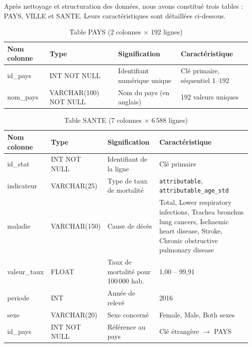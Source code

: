 \documentclass[mstat,12pt]{unswthesis}
\begin{document}
Après nettoyage et structuration des données, nous avons constitué trois
tables : PAYS, VILLE et SANTE. Leurs caractéristiques sont détaillées
ci-dessous.

\medskip

\begin{table}[H]
\centering
\renewcommand{\arraystretch}{1.3}
\begin{tabular}{|p{3cm}|p{3.5cm}|p{3cm}|p{3cm}|}
\hline
\textbf{Nom colonne} & \textbf{Type} & \textbf{Signification} & \textbf{Caractéristique} \\ \hline
id\_pays & INT NOT NULL & Identifiant numérique unique & Clé primaire, séquentiel 1--192 \\ \hline
nom\_pays & VARCHAR(100) NOT NULL & Nom du pays (en anglais) & 192 valeurs uniques \\ \hline
\end{tabular}
\medskip
\caption{Table PAYS (2 colonnes $\times$ 192 lignes)}
\end{table}
\begin{table}[H]
\centering
\renewcommand{\arraystretch}{1.3}
\begin{tabular}{|p{3cm}|p{3.5cm}|p{3cm}|p{4.5cm}|}
\hline
\textbf{Nom colonne} & \textbf{Type} & \textbf{Signification} & \textbf{Caractéristique} \\ \hline
id\_stat & INT NOT NULL & Identifiant de la ligne & Clé primaire \\ \hline
indicateur & VARCHAR(25) & Type de taux de mortalité & \texttt{attributable}, \texttt{attributable\_age\_std} \\ \hline
maladie & VARCHAR(150) & Cause de décès & Total, Lower respiratory infections, Trachea bronchus lung cancers, Ischaemic heart disease, Stroke, Chronic obstructive pulmonary disease \\ \hline
valeur\_taux & FLOAT & Taux de mortalité pour 100\,000 hab. & 1,00 -- 99,91 \\ \hline
periode & INT & Année de relevé & 2016 \\ \hline
sexe & VARCHAR(20) & Sexe concerné & Female, Male, Both sexes \\ \hline
id\_pays & INT NOT NULL & Référence au pays & Clé étrangère $\rightarrow$ PAYS \\ \hline
\end{tabular}
\medskip
\caption{Table SANTE (7 colonnes $\times$ 6\,588 lignes)}
\end{table}
\end{document}
